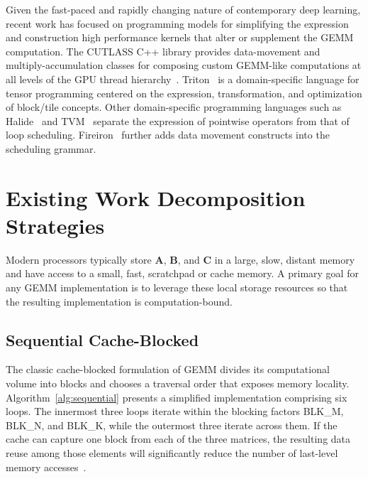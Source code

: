 Given the fast-paced and rapidly changing nature of contemporary deep learning, recent work has focused on programming models for simplifying the expression and construction high performance kernels that alter or supplement the GEMM computation. The CUTLASS C++ library provides data-movement and multiply-accumulation classes for composing custom GEMM-like computations at all levels of the GPU thread hierarchy~\cite{Kerr:2017:CUTLASS}. Triton~\cite{Tillet:2019:TAI} is a domain-specific language for tensor programming centered on the expression, transformation, and optimization of block/tile concepts. Other domain-specific programming languages such as Halide~\cite{Ragan-Kelley:2013:HAL} and TVM~\cite{Chen:2018:TEO} separate the expression of pointwise operators from that of loop scheduling. Fireiron~\cite{Hagedorn:2020:FAS} further adds data movement constructs into the scheduling grammar.

\section{Existing Work Decomposition Strategies}

Modern processors typically store \textbf{A}, \textbf{B}, and \textbf{C}
in a large, slow, distant memory and have access to a small, fast, scratchpad or cache memory. A primary goal for any GEMM implementation is to leverage these local storage resources so that the resulting implementation is computation-bound.

\subsection{Sequential Cache-Blocked} The classic cache-blocked formulation of GEMM divides its computational volume into blocks and chooses a traversal order that exposes memory locality. 
Algorithm~\ref{alg:sequential} presents a simplified implementation comprising six loops. The innermost three loops iterate within the blocking factors BLK\_M, 
BLK\_N, and BLK\_K, while the outermost three iterate across them. If the cache can capture one block from each of the three matrices, the resulting data reuse among those elements will significantly reduce the number of last-level memory accesses~\cite{Lam:1991:TCP}.

